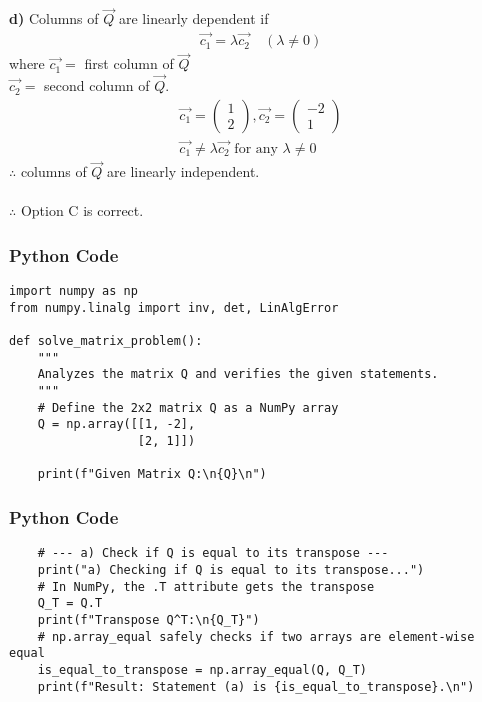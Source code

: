 \documentclass{beamer}
\begin{document}
\begin{frame}
\textbf{d)}
Columns of $\vec{Q}$ are linearly dependent if
\begin{align}
\vec{c_1} = \lambda \vec{c_2} \quad (\lambda \neq 0)
\end{align}
where $\vec{c_1} =$ first column of $\vec{Q}$ \\
$\vec{c_2} =$ second column of $\vec{Q}$.
\begin{align}
\vec{c_1} = \begin{pmatrix} 1 \\ 2 \end{pmatrix}, \vec{c_2} = \begin{pmatrix} -2 \\ 1 \end{pmatrix}\\
\vec{c_1} \neq \lambda \vec{c_2} \text{ for any } \lambda \neq 0
\end{align}
$\therefore$ columns of $\vec{Q}$ are linearly independent.\\\\
$\therefore$ Option C is correct.
\end{frame}

\begin{frame}[fragile]
    \frametitle{Python Code}
    \begin{lstlisting}
import numpy as np
from numpy.linalg import inv, det, LinAlgError

def solve_matrix_problem():
    """
    Analyzes the matrix Q and verifies the given statements.
    """
    # Define the 2x2 matrix Q as a NumPy array
    Q = np.array([[1, -2],
                  [2, 1]])

    print(f"Given Matrix Q:\n{Q}\n")
\end{lstlisting}
\end{frame}

\begin{frame}[fragile]
\frametitle{Python Code}
\begin{lstlisting}
    # --- a) Check if Q is equal to its transpose ---
    print("a) Checking if Q is equal to its transpose...")
    # In NumPy, the .T attribute gets the transpose
    Q_T = Q.T
    print(f"Transpose Q^T:\n{Q_T}")
    # np.array_equal safely checks if two arrays are element-wise equal
    is_equal_to_transpose = np.array_equal(Q, Q_T)
    print(f"Result: Statement (a) is {is_equal_to_transpose}.\n")
\end{lstlisting}
\end{frame}
\end{document}
